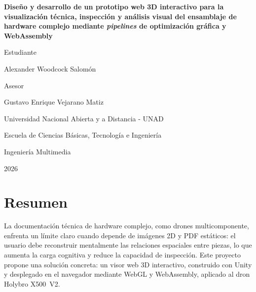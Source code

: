 \documentclass[12pt,letterpaper]{article}
\begin{document}
\begin{titlepage}
    \thispagestyle{plain}
    \centering
    {\normalfont\bfseries Dise\~no y desarrollo de un prototipo web 3D interactivo para la visualizaci\'on t\'ecnica, inspecci\'on y an\'alisis visual del ensamblaje de hardware complejo mediante \textit{pipelines} de optimizaci\'on gr\'afica y WebAssembly\par}

    \vspace{2\baselineskip}
    \vspace{2\baselineskip}

    {\normalfont Estudiante\par}
    {\normalfont Alexander Woodcock Salom\'on\par}

    \vspace{2\baselineskip}
    \vspace{2\baselineskip}

    {\normalfont Asesor\par}
    {\normalfont Gustavo Enrique Vejarano Matiz\par}

    \vfill

    {\normalfont Universidad Nacional Abierta y a Distancia - UNAD\par
     Escuela de Ciencias B\'asicas, Tecnolog\'ia e Ingenier\'ia\par
     Ingenier\'ia Multimedia\par}

    \vspace{1\baselineskip}
    {2026\par}
\end{titlepage}
\setcounter{page}{2}

\pagestyle{fancy}

\section*{Resumen}
{}
\setlength{\parindent}{0pt}
La documentaci\'on t\'ecnica de hardware complejo, como drones multicomponente, enfrenta un l\'imite claro cuando depende de im\'agenes 2D y PDF est\'aticos: el usuario debe reconstruir mentalmente las relaciones espaciales entre piezas, lo que aumenta la carga cognitiva y reduce la capacidad de inspecci\'on. Este proyecto propone una soluci\'on concreta: un visor web 3D interactivo, construido con Unity y desplegado en el navegador mediante WebGL y WebAssembly, aplicado al dron Holybro X500~V2.
\end{document}
